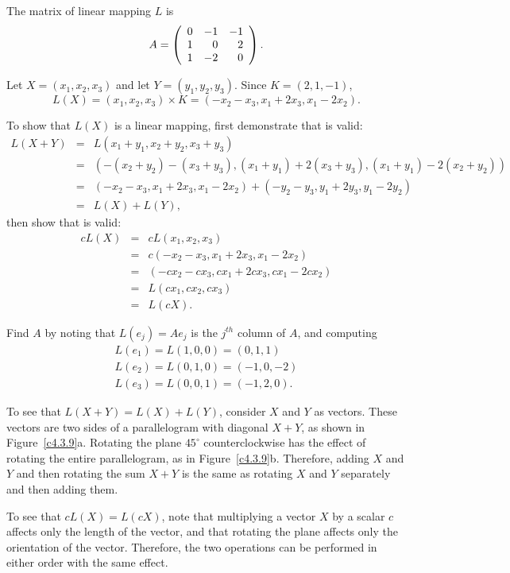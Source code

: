 \ans The matrix of linear mapping $L$ is
\[
A = \left(\begin{array}{rrr} 0 & -1 & -1 \\ 1 & 0 & 2 \\ 1 & -2 & 0\end{array}\right).
\]

\soln Let $X = (x_1,x_2,x_3)$ and let $Y = (y_1,y_2,y_3)$.  
Since $K = (2,1,-1)$,
\[
L(X) = (x_1,x_2,x_3) \times K = 
(-x_2 - x_3, x_1 + 2x_3, x_1 - 2x_2).
\]

To show that $L(X)$ is a linear mapping, first demonstrate that
 is valid:
\[
\begin{array}{rcl}
L(X + Y) & = & L(x_1 + y_1,x_2 + y_2,x_3 + y_3) \\
& = & (-(x_2 + y_2) - (x_3 + y_3), (x_1 + y_1) + 2(x_3 + y_3),
(x_1 + y_1) - 2(x_2 + y_2)) \\
& = & (-x_2 - x_3, x_1 + 2x_3, x_1 - 2x_2) +
(-y_2 - y_3, y_1 + 2y_3, y_1 - 2y_2) \\
& = & L(X) + L(Y), \end{array}
\]
then show that  is valid:
\[
\begin{array}{rcl}
cL(X) & = & cL(x_1,x_2,x_3) \\
& = & c(-x_2 - x_3, x_1 + 2x_3, x_1 - 2x_2) \\
& = & (-cx_2 - cx_3, cx_1 + 2cx_3, cx_1 - 2cx_2) \\
& = & L(cx_1,cx_2,cx_3) \\
& = & L(cX). \end{array}
\]

Find $A$ by noting that $L(e_j) = Ae_j$ is the $j^{th}$ column of $A$,
and computing
\[ \begin{array}{l}
L(e_1) = L(1,0,0) = (0,1,1) \\
L(e_2) = L(0,1,0) = (-1,0,-2) \\
L(e_3) = L(0,0,1) = (-1,2,0). \end{array} \]


To see that $L(X + Y) = L(X) + L(Y)$, consider $X$ and $Y$ as
vectors.  These vectors are two sides of a parallelogram with
diagonal $X + Y$, as shown in Figure~\ref{c4.3.9}a.  Rotating
the plane $45^\circ$ counterclockwise has the effect of
rotating the entire parallelogram, as in Figure~\ref{c4.3.9}b.
Therefore, adding $X$ and $Y$ and then rotating the sum
$X + Y$ is the same as rotating $X$ and $Y$ separately and
then adding them.

\para To see that $cL(X) = L(cX)$, note that multiplying a
vector $X$ by a scalar $c$ affects only the length of the vector,
and that rotating the plane affects only the orientation of
the vector.  Therefore, the two operations can be performed in
either order with the same effect.

